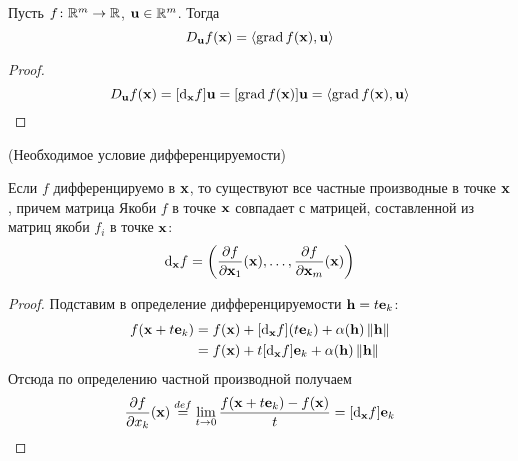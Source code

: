 \begin{proposition}
    Пусть $f \colon \Rm \to \R$, $\elemvec{u} \in \Rm$. Тогда
\[
    \dder{f}{\x}{\elemvec{u}} = \langle \grad{f}{\x}, \elemvec{u} \rangle
\]
\end{proposition}
\begin{proof}
    \enewline
\[
    \dder{f}{\x}{\elemvec{u}} = [\der{f}{\x}]\elemvec{u} =
    [\grad{f}{\x}]\elemvec{u} = \langle \grad{f}{\x}, \elemvec{u} \rangle
\]
\end{proof}

\begin{proposition}(Необходимое условие дифференцируемости)

    Если $f$ дифференцируемо в $\x$, то существуют все частные производные в
    точке $\x$, причем матрица Якоби $f$ в точке $\x$ совпадает с матрицей,
    составленной из матриц якоби $f_i$ в точке $\x$:
\[
    \der{f}{\x} = \left(\pderv{f}{\x_1}(\x), \ldots, \pderv{f}{\x_m}(\x)\right)
\]
\end{proposition}
\begin{proof}

    Подставим в определение дифференцируемости $\h = t \elemvec{e}_k$:
\begin{align*}
    f(\x + t \elemvec{e}_k) &= f(\x) + [\der{f}{\x}](t \elemvec{e}_k) +
    \a(\h)\norm{\h} \\ &= f(\x) + t[\der{f}{\x}]\elemvec{e}_k +
    \a(\h)\norm{\h}
\end{align*}
    Отсюда по определению частной производной получаем
\[
    \pderv{f}{x_k}(\x) \defeq \lim_{t \to 0}{\frac{f(\x +
    t\elemvec{e}_k) - f(\x)}{t}} = [\der{f}{\x}]\elemvec{e}_k
\]
\end{proof}

